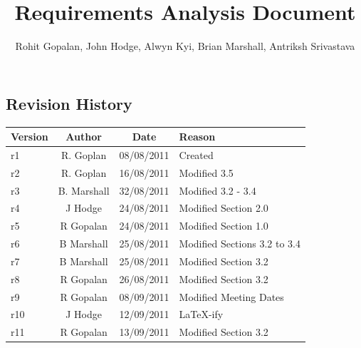 
\title{Requirements Analysis Document}
\author{Rohit Gopalan, John Hodge, Alwyn Kyi, Brian Marshall, Antriksh Srivastava}

\pagestyle{fancy}
\renewcommand{\headheight}{15pt}
\fancyhead{} \fancyfoot{}
\fancyfoot[R]{\thepage \slash \pageref{LastPage}}	%
\renewcommand{\headrulewidth}{0.4pt} \renewcommand{\footrulewidth}{0.4pt}
\renewcommand{\headsep}{24pt}



\maketitle

\subsection*{Revision History}
\begin{tabularx}{\textwidth}{l c c X}
 \hline
 Version & Author & Date & Reason \\
 \hline \hline
 r1 & R. Goplan & 08/08/2011 & Created \\ \hline
 r2 & R. Goplan & 16/08/2011 & Modified 3.5 \\ \hline
 r3 & B. Marshall & 32/08/2011 & Modified 3.2 - 3.4 \\ \hline
 r4 & J Hodge & 24/08/2011 & Modified Section 2.0 \\ \hline
 r5 & R Gopalan & 24/08/2011 & Modified Section 1.0 \\ \hline
 r6 & B Marshall & 25/08/2011 & Modified Sections 3.2 to 3.4 \\ \hline
 r7 & B Marshall & 25/08/2011 & Modified Section 3.2 \\ \hline
 r8 & R Gopalan & 26/08/2011 & Modified Section 3.2 \\ \hline
 r9 & R Gopalan & 08/09/2011 & Modified Meeting Dates \\ \hline
 r10 & J Hodge & 12/09/2011 & LaTeX-ify \\ \hline
 r11 & R Gopalan & 13/09/2011 & Modified Section 3.2 \\ \hline
\end{tabularx}


